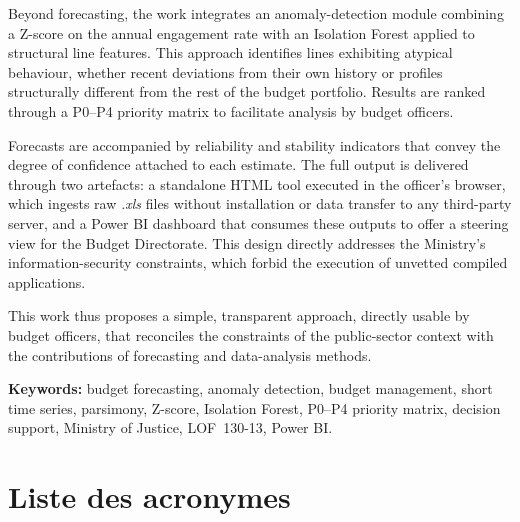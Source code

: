 \documentclass[12pt,a4paper]{article}
\begin{document}
Beyond forecasting, the work integrates an anomaly-detection module combining a Z-score on the annual engagement rate with an Isolation Forest applied to structural line features. This approach identifies lines exhibiting atypical behaviour, whether recent deviations from their own history or profiles structurally different from the rest of the budget portfolio. Results are ranked through a P0--P4 priority matrix to facilitate analysis by budget officers.

Forecasts are accompanied by reliability and stability indicators that convey the degree of confidence attached to each estimate. The full output is delivered through two artefacts: a standalone HTML tool executed in the officer's browser, which ingests raw \textit{.xls} files without installation or data transfer to any third-party server, and a Power BI dashboard that consumes these outputs to offer a steering view for the Budget Directorate. This design directly addresses the Ministry's information-security constraints, which forbid the execution of unvetted compiled applications.

This work thus proposes a simple, transparent approach, directly usable by budget officers, that reconciles the constraints of the public-sector context with the contributions of forecasting and data-analysis methods.

\bigskip
\noindent\textbf{Keywords:} budget forecasting, anomaly detection, budget management, short time series, parsimony, Z-score, Isolation Forest, P0--P4 priority matrix, decision support, Ministry of Justice, LOF~130-13, Power BI.

\newpage

{}
\listoffigures

\newpage

{}
\listoftables

\newpage

\section*{Liste des acronymes}
\end{document}
